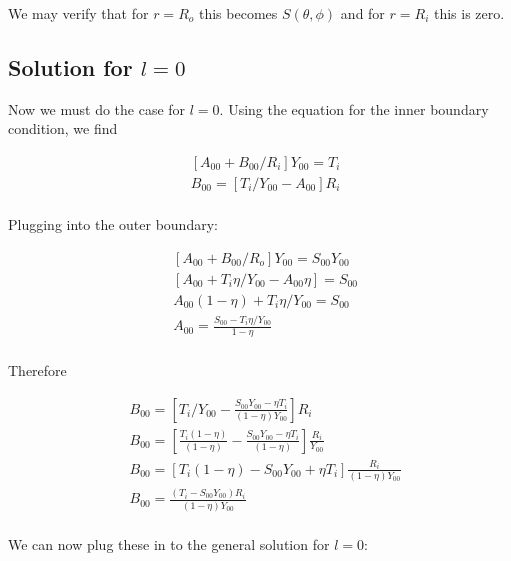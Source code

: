 \documentclass[a4paper,10pt]{article}
\begin{document}
We may verify that for $r = R_o$ this becomes $S(\theta, \phi)$ and for $r=R_i$ this is zero.

\subsection{Solution for $l=0$}


Now we must do the case for $l=0$.  Using the equation for the inner boundary condition, we find 

\begin{equation}
\begin{aligned}
& \left[A_{00} + B_{00}/R_i \right] Y_{00} = T_i \\
& B_{00} = \left[T_i/Y_{00} - A_{00} \right] R_i\\
\end{aligned}
\end{equation}

Plugging into the outer boundary:

\begin{equation}
\begin{aligned}
& \left[A_{00} + B_{00}/R_o \right] Y_{00} = S_{00} Y_{00}\\
& \left[A_{00} + T_i\eta/Y_{00} -A_{00}\eta \right] = S_{00}\\
& A_{00} (1-\eta) + T_i\eta/Y_{00} = S_{00}\\
& A_{00} =  \frac{S_{00} - T_i\eta/Y_{00} }{1-\eta} \\
\end{aligned}
\end{equation}

Therefore

\begin{equation}
\begin{aligned}
& B_{00} = \left[T_i/Y_{00} - \frac{ S_{00} Y_{00} - \eta T_i}{(1-\eta) Y_{00} }  \right] R_i\\
& B_{00} = \left[\frac{T_i (1-\eta)}{(1-\eta)} - \frac{ S_{00}Y_{00} - \eta T_i}{(1-\eta) }  \right] \frac{R_i}{Y_{00}}\\
& B_{00} = \left[T_i (1-\eta) - S_{00}Y_{00} + \eta T_i  \right] \frac{R_i}{(1-\eta) Y_{00}}\\
& B_{00} = \frac{(T_i-S_{00}Y_{00}) R_i}{(1-\eta) Y_{00}}\\
\end{aligned}
\end{equation}

We can now plug these in to the general solution for $l=0$:
\end{document}
